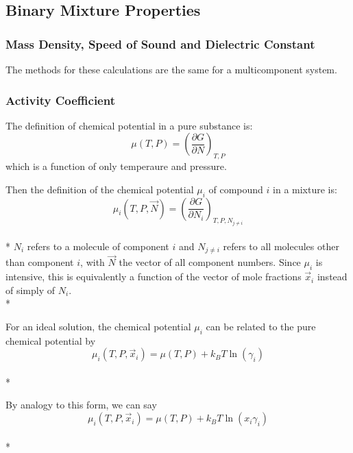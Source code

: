 \documentclass[9pt,bestpractices]{livecoms}
\begin{document}

\subsection{Binary Mixture Properties} 
\subsubsection{Mass Density, Speed of Sound and Dielectric Constant}
The methods for these calculations are the same for a multicomponent system.


\subsubsection{Activity Coefficient}
The definition of chemical potential in a pure substance is:
\begin{equation}\mu(T,P) = \left(\frac{\partial G}{\partial N}\right)_{T,P}\end{equation}
which is a function of only temperaure and pressure.

Then the definition of the chemical potential $\mu_i$ of compound $i$ in a mixture is:
\begin{equation}\mu_{i}(T,P,\vec{N}) = \left(\frac{\partial G}{\partial N_{i}}\right)_{T,P,N_{j \neq i}}\end{equation}\\*
$N_i$ refers to a molecule of component $i$ and $N_{j \neq i}$ refers
to all molecules other than component $i$, with $\vec{N}$ the vector
of all component numbers. Since $\mu_i$ is intensive, this is
equivalently a function of the vector of mole fractions $\vec{x}_i$ instead of simply of $N_i$.\\*

For an ideal solution, the chemical potential $\mu_i$ can be related to the pure chemical potential by 
\begin{equation}\mu_{i}(T,P,\vec{x}_i) = \mu(T,P) + k_B T \ln\left(\gamma_i\right)\end{equation}\\*

By analogy to this form, we can say 
\begin{equation}\mu_{i}(T,P,\vec{x}_i) = \mu(T,P) + k_B T \ln\left(x_i \gamma_i\right)\end{equation}\\*
\end{document}
